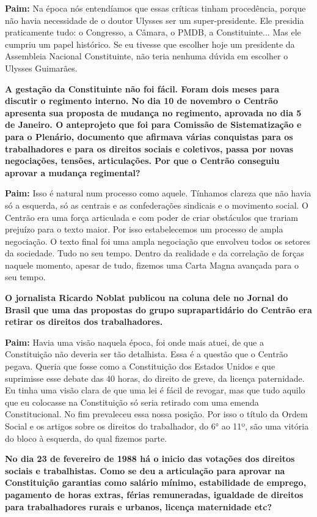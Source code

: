 \textbf{Paim:} Na época nós entendíamos que essas críticas tinham
procedência, porque não havia necessidade de o doutor Ulysses ser um
super-presidente. Ele presidia praticamente tudo: o Congresso, a Câmara,
o PMDB, a Constituinte... Mas ele cumpriu um papel histórico. Se eu
tivesse que escolher hoje um presidente da Assembleia Nacional
Constituinte, não teria nenhuma dúvida em escolher o Ulysses Guimarães.

\textbf{A gestação da Constituinte não foi fácil. Foram dois meses para
discutir o regimento interno. No dia 10 de novembro o Centrão apresenta
sua proposta de mudança no regimento, aprovada no dia 5 de Janeiro. O
anteprojeto que foi para Comissão de Sistematização e para o Plenário,
documento que afirmava várias conquistas para os trabalhadores e para os
direitos sociais e coletivos, passa por novas negociações, tensões,
articulações. Por que o Centrão conseguiu aprovar a mudança regimental?}

\textbf{Paim:} Isso é natural num processo como aquele. Tínhamos clareza
que não havia só a esquerda, só as centrais e as confederações sindicais
e o movimento social. O Centrão era uma força articulada e com poder de
criar obstáculos que trariam prejuízo para o texto maior. Por isso
estabelecemos um processo de ampla negociação. O texto final foi uma
ampla negociação que envolveu todos os setores da sociedade. Tudo no seu
tempo. Dentro da realidade e da correlação de forças naquele momento,
apesar de tudo, fizemos uma Carta Magna avançada para o seu tempo.

\textbf{O jornalista Ricardo Noblat publicou na coluna dele no Jornal do
Brasil que uma das propostas do grupo suprapartidário do Centrão era
retirar os direitos dos trabalhadores.}

\textbf{Paim:} Havia uma visão naquela época, foi onde mais atuei, de
que a Constituição não deveria ser tão detalhista. Essa é a questão que
o Centrão pegava. Queria que fosse como a Constituição dos Estados
Unidos e que suprimisse esse debate das 40 horas, do direito de greve,
da licença paternidade. Eu tinha uma visão clara de que uma lei é fácil
de revogar, mas que tudo aquilo que eu colocasse na Constituição só
seria retirado com uma emenda Constitucional. No fim prevaleceu essa
nossa posição. Por isso o título da Ordem Social e os artigos sobre os
direitos do trabalhador, do 6° ao 11º, são uma vitória do bloco à
esquerda, do qual fizemos parte.

\textbf{No dia 23 de fevereiro de 1988 há o inicio das votações dos
direitos sociais e trabalhistas. Como se deu a articulação para aprovar
na Constituição garantias como salário mínimo, estabilidade de emprego,
pagamento de horas extras, férias remuneradas, igualdade de direitos
para trabalhadores rurais e urbanos, licença maternidade etc?}

